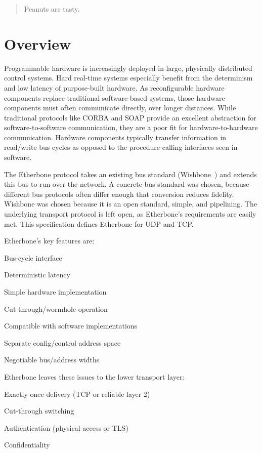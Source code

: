 \documentclass{article}
\newenvironment{packed_itemize}{
\begin{itemize}
  \setlength{\itemsep}{1pt}
  \setlength{\parskip}{0pt}
  \setlength{\parsep}{0pt}
}{\end{itemize}}
\begin{document}
\begin{abstract}
Peanuts are tasty.
\end{abstract}

\section{Overview}

Programmable hardware is increasingly deployed in large, physically distributed control systems.
Hard real-time systems especially benefit from the determinism and low latency of purpose-built hardware.
As reconfigurable hardware components replace traditional software-based systems, 
those hardware components must often communicate directly, over longer distances.
While traditional protocols like CORBA and SOAP 
provide an excellent abstraction for software-to-software communication,
they are a poor fit for hardware-to-hardware communication.
Hardware components typically transfer information in read/write bus cycles
as opposed to the procedure calling interfaces seen in software.

The Etherbone protocol takes an existing bus standard (Wishbone~\cite{wishbone}) 
and extends this bus to run over the network.
A concrete bus standard was chosen, 
because different bus protocols often differ enough that conversion reduces fidelity.
Wishbone was chosen because it is an open standard, simple, and pipe\-lining.
The underlying transport protocol is left open,
as Etherbone's require\-ments are easily met.
This specification defines Etherbone for UDP and TCP.

Etherbone's key features are:
\begin{packed_itemize}
\item Bus-cycle interface
\item Deterministic latency
\item Simple hardware implementation
\item Cut-through/wormhole operation
\item Compatible with software implementations
\item Separate config/control address space
\item Negotiable bus/address widths
\end{packed_itemize}

Etherbone leaves these issues to the lower transport layer:
\begin{packed_itemize}
\item Exactly once delivery (TCP or reliable layer 2)
\item Cut-through switching
\item Authentication (physical access or TLS)
\item Confidentiality
\end{packed_itemize}
\end{document}
